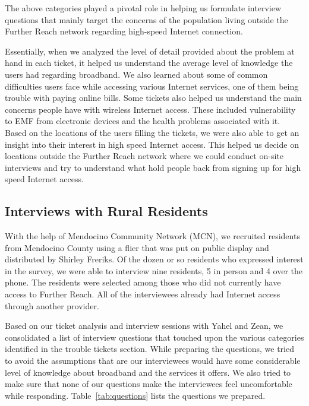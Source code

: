 The above categories played a pivotal role in helping us formulate interview questions that mainly target the concerns of the population living outside the Further Reach network regarding high-speed Internet connection.

Essentially, when we analyzed the level of detail provided about the problem
at hand in each ticket, it helped us understand the average level of knowledge
the users had regarding broadband. We also learned about some of common
difficulties users face while accessing various Internet services, one of them
being trouble with paying online bills. Some tickets also helped us understand
the main concerns people have with wireless Internet access. These included
vulnerability to EMF from electronic devices and the health problems
associated with it. Based on the locations of the users filling the tickets,
we were also able to get an insight into their interest in high speed Internet
access. This helped us decide on locations outside the Further Reach network
where we could conduct on-site interviews and try to understand what hold
people back from signing up for high speed Internet access.

\subsection{Interviews with Rural Residents}
\label{sec:interv-with-rural}

With the help of Mendocino Community Network (MCN), we recruited
residents from Mendocino County using a flier that was put on public display
and distributed by Shirley Freriks.
Of the dozen or so residents who expressed interest in the survey, we were able to interview
nine residents, 5 in person and 4 over the phone. The residents were selected among those
who did not currently have access to Further Reach. All of the interviewees
already had Internet access through another provider.

Based on our ticket analysis and interview sessions with Yahel and Zean, we consolidated a list of interview
questions that touched upon the various categories identified in the trouble tickets section. While preparing
the questions, we tried to avoid the assumptions that are our interviewees would have some considerable level
of knowledge about broadband and the services it offers. We also tried to make sure that none of our questions
make the interviewees feel uncomfortable while responding. Table~\ref{tab:questions} lists the questions
we prepared.

